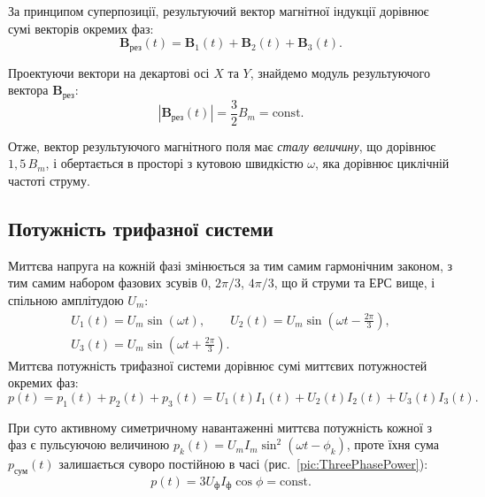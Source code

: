 За принципом суперпозиції, результуючий вектор магнітної індукції дорівнює сумі векторів окремих фаз:
\begin{equation}
	\mathbf{B}_{\text{рез}}(t) = \mathbf{B}_1(t) + \mathbf{B}_2(t) + \mathbf{B}_3(t).
\end{equation}

Проектуючи вектори на декартові осі $X$ та $Y$, знайдемо модуль результуючого вектора $\mathbf{B}_{\text{рез}}$:
\begin{equation}
	|\mathbf{B}_{\text{рез}}(t)| = \frac{3}{2} B_m = \text{const}.
\end{equation}

Отже, вектор результуючого магнітного поля має \emph{сталу величину}, що дорівнює $1{,}5\,B_m$, і обертається в просторі з кутовою швидкістю $\omega$, яка дорівнює циклічній частоті струму.

\subsection*{Потужність трифазної системи}

Миттєва напруга на кожній фазі змінюється за тим самим гармонічним законом, з тим самим набором фазових зсувів $0$, $2\pi/3$, $4\pi/3$, що й струми та ЕРС вище, і спільною амплітудою $U_m$:
\begin{equation*}
	\begin{gathered}
		U_1(t) = U_m \sin(\omega t), \qquad U_2(t) = U_m \sin\left(\omega t - \frac{2\pi}{3}\right), \\
		U_3(t) = U_m \sin\left(\omega t + \frac{2\pi}{3}\right).
	\end{gathered}
\end{equation*}
Миттєва потужність трифазної системи дорівнює сумі миттєвих потужностей окремих фаз:
\begin{equation}
	p(t) = p_1(t) + p_2(t) + p_3(t) = U_1(t)I_1(t) + U_2(t)I_2(t) + U_3(t)I_3(t).
\end{equation}

При суто активному симетричному навантаженні миттєва потужність кожної з фаз є пульсуючою величиною $p_k(t) = U_m I_m \sin^2(\omega t - \phi_k)$, проте їхня сума $p_{\text{сум}}(t)$ залишається суворо постійною в часі (рис.~\ref{pic:ThreePhasePower}):
\begin{equation}
	p(t) = 3 U_\text{ф} I_\text{ф} \cos\phi = \text{const}.
\end{equation}

